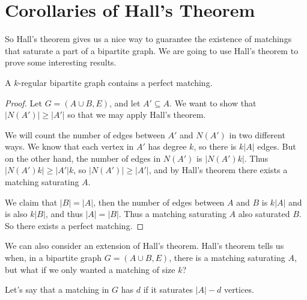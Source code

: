 \documentclass[a4paper]{scrreprt}
\begin{document}



\section{Corollaries of Hall's Theorem}

So Hall's theorem gives us a nice way to guarantee the existence of matchings that saturate a part of a bipartite graph. We are going to use Hall's theorem to prove some interesting results.


\begin{corollary}
	A $k$-regular bipartite graph contains a perfect matching.
\end{corollary}
\begin{proof}
	Let $G = (A \cup B, E)$, and let $A' \subseteq A$. We want to show that $|N(A')| \geq |A'|$ so that we may apply Hall's theorem.

	We will count the number of edges between $A'$ and $N(A')$ in two different ways. We know that each vertex in $A'$ has degree $k$, so there is $k|A|$ edges. But on the other hand, the number of edges in $N(A')$ is $|N(A')k|$. Thus $|N(A')k| \geq |A'|k$, so $|N(A')| \geq |A'|$, and by Hall's theorem
	there exists a matching saturating $A$.

	We claim that $|B| = |A|$, then the number of edges between $A$ and $B$ is $k|A|$ and is also $k|B|$, and thus $|A| = |B|$. Thus a matching saturating $A$ also saturated $B$. So there exists a perfect matching.
\end{proof}

We can also consider an extension of Hall's theorem. Hall's theorem tells us when, in a bipartite graph $G = (A \cup B, E)$, there is a matching saturating $A$, but what if we only wanted a matching of size $k$?

Let's say that a matching in $G$ has  $d$ if it saturates $|A| - d$ vertices. 
\end{document}
